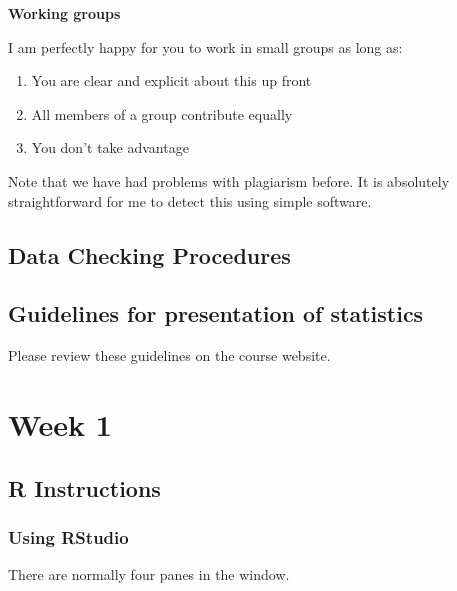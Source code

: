 \documentclass[]{book}
\providecommand{\tightlist}{%
  \setlength{\itemsep}{0pt}\setlength{\parskip}{0pt}}
\begin{document}
\textbf{Working groups}

I am perfectly happy for you to work in small groups as long as:

\begin{enumerate}
\def\labelenumi{\arabic{enumi}.}
\tightlist
\item
  You are clear and explicit about this up front
\item
  All members of a group contribute equally
\item
  You don't take advantage
\end{enumerate}

Note that we have had problems with plagiarism before. It is absolutely
straightforward for me to detect this using simple software.

\hypertarget{data-checking-procedures}{%
\section*{Data Checking Procedures}\label{data-checking-procedures}}

\hypertarget{guidelines-for-presentation-of-statistics}{%
\section*{Guidelines for presentation of
statistics}\label{guidelines-for-presentation-of-statistics}}

Please review these guidelines on the course website.

\hypertarget{week-1}{%
\chapter{Week 1}\label{week-1}}

\hypertarget{r-instructions}{%
\section{R Instructions}\label{r-instructions}}

\hypertarget{using-rstudio}{%
\subsection{Using RStudio}\label{using-rstudio}}

There are normally four panes in the window.
\end{document}
